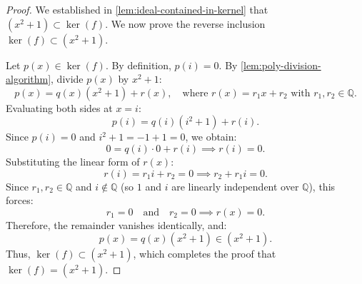 \begin{content}[Proof that \texorpdfstring{$\ker(f) = (x^2+1)$}{ker(f) = (x^2+1)} and Final Isomorphism]

\begin{proof}
We established in \cref{lem:ideal-contained-in-kernel} that $(x^2 + 1) \subset \ker(f)$. We now prove the reverse inclusion $\ker(f) \subset (x^2 + 1)$.

Let $p(x) \in \ker(f)$. By definition, $p(i) = 0$. By \cref{lem:poly-division-algorithm}, divide $p(x)$ by $x^2 + 1$:
\[
p(x) = q(x)(x^2 + 1) + r(x), \quad \text{where } r(x) = r_1 x + r_2 \text{ with } r_1, r_2 \in \mathbb{Q}.
\]
Evaluating both sides at $x = i$:
\[
p(i) = q(i)(i^2 + 1) + r(i).
\]
Since $p(i) = 0$ and $i^2 + 1 = -1 + 1 = 0$, we obtain:
\[
0 = q(i) \cdot 0 + r(i) \implies r(i) = 0.
\]
Substituting the linear form of $r(x)$:
\[
r(i) = r_1 i + r_2 = 0 \implies r_2 + r_1 i = 0.
\]
Since $r_1, r_2 \in \mathbb{Q}$ and $i \notin \mathbb{Q}$ (so $1$ and $i$ are linearly independent over $\mathbb{Q}$), this forces:
\[
r_1 = 0 \quad \text{and} \quad r_2 = 0 \implies r(x) = 0.
\]
Therefore, the remainder vanishes identically, and:
\[
p(x) = q(x)(x^2 + 1) \in (x^2 + 1).
\]
Thus, $\ker(f) \subset (x^2 + 1)$, which completes the proof that $\ker(f) = (x^2 + 1)$.
\end{proof}

\end{content}

